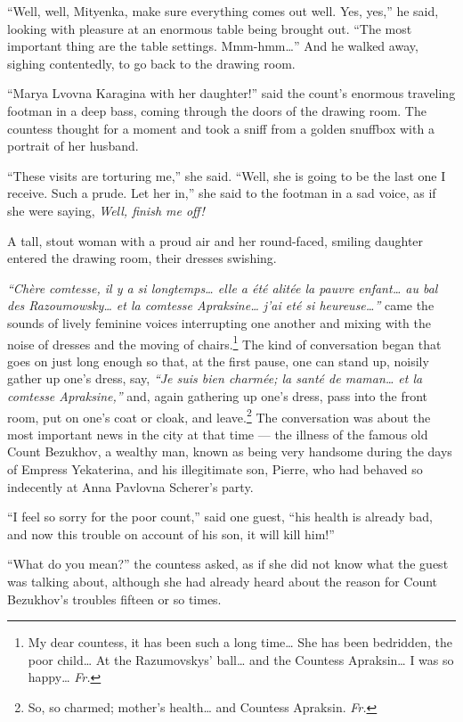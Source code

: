 ``Well, well, Mityenka, make sure everything comes out well. Yes, yes,'' he said, looking with pleasure at an enormous table being brought out. ``The most important thing are the table settings. Mmm-hmm\ldots{}'' And he walked away, sighing contentedly, to go back to the drawing room. %

``Marya Lvovna Karagina with her daughter!'' said the count's enormous traveling footman in a deep bass, coming through the doors of the drawing room. The countess thought for a moment and took a sniff from a golden snuffbox with a portrait of her husband.

``These visits are torturing me,'' she said. ``Well, she is going to be the last one I receive. Such a prude. Let her in,'' she said to the footman in a sad voice, as if she were saying, \textit{Well, finish me off!} %

A tall, stout woman with a proud air and her round-faced, smiling daughter entered the drawing room, their dresses swishing.

\textit{``Ch\`ere comtesse, il y a si longtemps\ldots{} elle a \'et\'e alit\'ee la pauvre enfant\ldots{} au bal des Razoumowsky\ldots{} et la comtesse Apraksine\ldots{} j'ai et\'e si heureuse\ldots{}''} came the sounds of lively feminine voices interrupting one another and mixing with the noise of dresses and the moving of chairs.\footnote{My dear countess, it has been such a long time\ldots{} She has been bedridden, the poor child\ldots{} At the Razumovskys' ball\ldots{} and the Countess Apraksin\ldots{} I was so happy\ldots{} \textit{Fr.}} The kind of conversation began that goes on just long enough so that, at the first pause, one can stand up, noisily gather up one's dress, say, \textit{``Je suis bien charm\'ee; la sant\'e de maman\ldots{} et la comtesse Apraksine,''} and, again gathering up one's dress, pass into the front room, put on one's coat or cloak, and leave.\footnote{So, so charmed; mother's health\ldots{} and Countess Apraksin. \textit{Fr.}} The conversation was about the most important news in the city at that time --- the illness of the famous old Count Bezukhov, a wealthy man, known as being very handsome during the days of Empress Yekaterina, and his illegitimate son, Pierre, who had behaved so indecently at Anna Pavlovna Scherer's party.

``I feel so sorry for the poor count,'' said one guest, ``his health is already bad, and now this trouble on account of his son, it will kill him!''

``What do you mean?'' the countess asked, as if she did not know what the guest was talking about, although she had already heard about the reason for Count Bezukhov's troubles fifteen or so times. %


